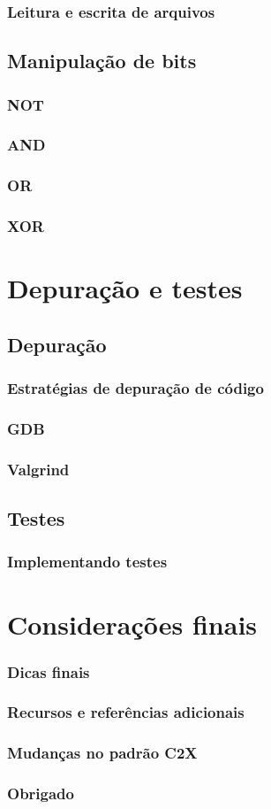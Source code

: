 \documentclass{book}
\begin{document}
\subsection{Leitura e escrita de arquivos}

\section{Manipulação de bits}
\subsection{NOT}
\subsection{AND}
\subsection{OR}
\subsection{XOR}

\chapter{Depuração e testes}

\section{Depuração}
\subsection{Estratégias de depuração de código}
\subsection{GDB}
\subsection{Valgrind}

\section{Testes}
\subsection{Implementando testes}

\chapter{Considerações finais}
\subsection{Dicas finais}
\subsection{Recursos e referências adicionais}
\subsection{Mudanças no padrão C2X}
\subsection{Obrigado}
\end{document}
